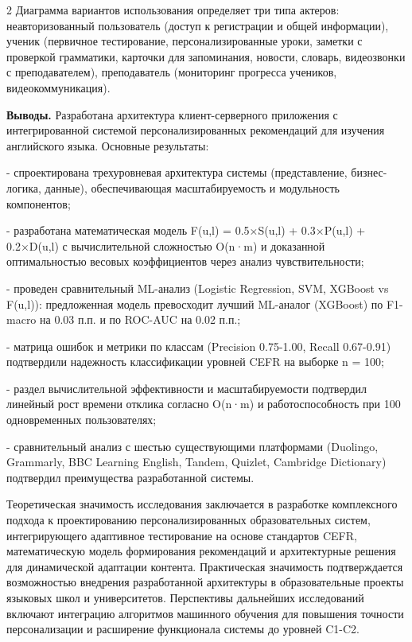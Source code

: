\begin{multicols}{2}
Диаграмма вариантов использования определяет три типа актеров:
неавторизованный пользователь (доступ к регистрации и общей информации),
ученик (первичное тестирование, персонализированные уроки, заметки с
проверкой грамматики, карточки для запоминания, новости, словарь,
видеозвонки с преподавателем), преподаватель (мониторинг прогресса
учеников, видеокоммуникация).

{\bfseries Выводы.} Разработана архитектура клиент-серверного приложения с
интегрированной системой персонализированных рекомендаций для изучения
английского языка. Основные результаты:

- спроектирована трехуровневая архитектура системы (представление,
бизнес-логика, данные), обеспечивающая масштабируемость и модульность
компонентов;

- разработана математическая модель F(u,l) = 0.5×S(u,l) + 0.3×P(u,l) +
0.2×D(u,l) с вычислительной сложностью O(n·m) и доказанной
оптимальностью весовых коэффициентов через анализ чувствительности;

- проведен сравнительный ML-анализ (Logistic Regression, SVM, XGBoost vs
F(u,l)): предложенная модель превосходит лучший ML-аналог (XGBoost) по
F1-macro на 0.03 п.п. и по ROC-AUC на 0.02 п.п.;

- матрица ошибок и метрики по классам (Precision 0.75-1.00, Recall
0.67-0.91) подтвердили надежность классификации уровней CEFR на выборке
n = 100;

- раздел вычислительной эффективности и масштабируемости подтвердил
линейный рост времени отклика согласно O(n·m) и работоспособность при
100 одновременных пользователях;

- сравнительный анализ с шестью существующими платформами (Duolingo,
Grammarly, BBC Learning English, Tandem, Quizlet, Cambridge Dictionary)
подтвердил преимущества разработанной системы.

Теоретическая значимость исследования заключается в разработке
комплексного подхода к проектированию персонализированных
образовательных систем, интегрирующего адаптивное тестирование на основе
стандартов CEFR, математическую модель формирования рекомендаций и
архитектурные решения для динамической адаптации контента. Практическая
значимость подтверждается возможностью внедрения разработанной
архитектуры в образовательные проекты языковых школ и университетов.
Перспективы дальнейших исследований включают интеграцию алгоритмов
машинного обучения для повышения точности персонализации и расширение
функционала системы до уровней C1-C2.
\end{multicols}

